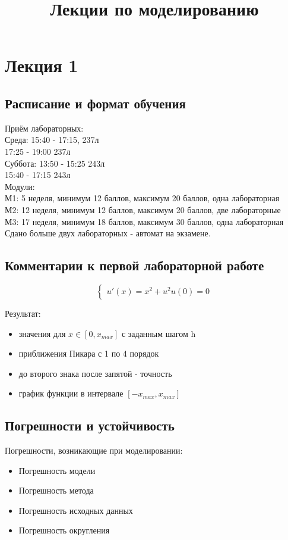 \title{Лекции по моделированию}
\chapter{Лекция 1}
\section{Расписание и формат обучения}
Приём лабораторных:\\
Среда:
15:40 - 17:15, 237л\\
17:25 - 19:00 237л\\

Суббота:
13:50 - 15:25 243л\\
15:40 - 17:15 243л\\

Модули:\\
М1: 5 неделя, минимум 12 баллов, максимум 20 баллов, одна лабораторная\\
М2: 12 неделя, минимум 12 баллов, максимум 20 баллов, две лабораторные\\
М3: 17 неделя, минимум 18 баллов, максимум 30 баллов, одна лабораторная\\

Сдано больше двух лабораторных - автомат на экзамене.

\section{Комментарии к первой лабораторной работе}
\begin{equation}
\begin{cases}
u'(x) = x^{2} + u^{2}
u(0) = 0
\end{cases}
\end{equation}

Результат:
\begin{itemize}
\item значения для $x \in [0, x_{max}]$ с заданным шагом h
\item приближения Пикара с 1 по 4 порядок
\item до второго знака после запятой - точность
\item график функции в интервале $[-x_{max}, x_{max}]$
\end{itemize}

\section{Погрешности и устойчивость}
Погрешности, возникающие при моделировании:
\begin{itemize}
\item Погрешность модели
\item Погрешность метода
\item Погрешность исходных данных
\item Погрешность округления
\end{itemize}

